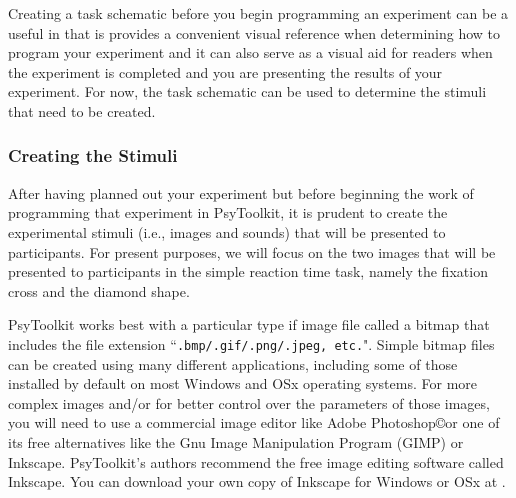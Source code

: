 Creating a task schematic before you begin programming an experiment can be a useful in that is provides a convenient visual reference when determining how to program your experiment and it can also serve as a visual aid for readers when the experiment is completed and you are presenting the results of your experiment. For now, the task schematic can be used to determine the stimuli that need to be created. 

\subsubsection{Creating the Stimuli}
After having planned out your experiment but before beginning the work of programming that experiment in PsyToolkit, it is prudent to create the experimental stimuli (i.e., images and sounds) that will be presented to participants.  For present purposes, we will focus on the two images that will be presented to participants in the simple reaction time task, namely the fixation cross and the diamond shape.

PsyToolkit works best with a particular type if image file called a bitmap that includes the file extension ``\texttt{.bmp/.gif/.png/.jpeg, etc.}".  Simple bitmap files can be created using many different applications, including some of those installed by default on most Windows and OSx operating systems.  For more complex images and/or for better control over the parameters of those images, you will need to use a commercial image editor like Adobe Photoshop\copyright or one of its free alternatives like the Gnu Image Manipulation Program (GIMP) or Inkscape. PsyToolkit's authors recommend the free image editing software called Inkscape.  You can download your own copy of Inkscape for Windows or OSx at .


